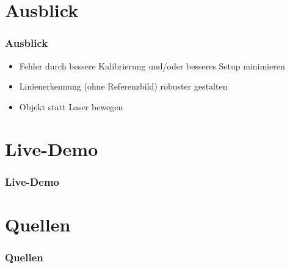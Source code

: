 \documentclass[xcolor=dvipsnames]{beamer}
\begin{document}

\section{Ausblick}
\begin{frame}
	\frametitle{Ausblick}

	\begin{itemize}
		\item Fehler durch bessere Kalibrierung und/oder besseres Setup minimieren
		\item Linienerkennung (ohne Referenzbild) robuster gestalten
		\item Objekt statt Laser bewegen
	\end{itemize}

\end{frame}


\section{Live-Demo} 
\begin{frame}
	\frametitle{Live-Demo}
\end{frame}


\section{Quellen} 
\begin{frame}
	\frametitle{Quellen}

\end{frame}
\end{document}
